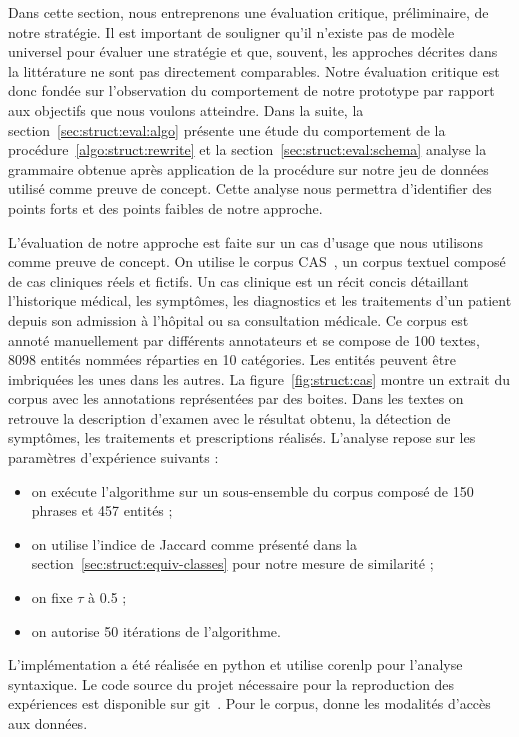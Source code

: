 Dans cette section, nous entreprenons une évaluation critique, préliminaire, de notre stratégie.
Il est important de souligner qu'il n'existe pas de modèle universel pour évaluer une stratégie et que, souvent, les approches décrites dans la littérature ne sont pas directement comparables.
Notre évaluation critique est donc fondée sur l'observation du comportement de notre prototype par rapport aux objectifs que nous voulons atteindre.
Dans la suite, la section~\ref{sec:struct:eval:algo} présente une étude du comportement de la procédure~\ref{algo:struct:rewrite} et la section~\ref{sec:struct:eval:schema} analyse la grammaire obtenue après application de la procédure sur notre jeu de données utilisé comme preuve de concept.
Cette analyse nous permettra d'identifier des points forts et des points faibles de notre approche.

L'évaluation de notre approche est faite sur un cas d'usage que nous utilisons comme preuve de concept.
On utilise le corpus CAS~\cite{grabarCASFrenchCorpus2018}, un corpus textuel composé de cas cliniques réels et fictifs.
Un cas clinique est un récit concis détaillant l'historique médical, les symptômes, les diagnostics et les traitements d'un patient depuis son admission à l'hôpital ou sa consultation médicale.
Ce corpus est annoté manuellement par différents annotateurs et se compose de \num{100} textes, \num{8098} entités nommées réparties en \num{10} catégories.
Les entités peuvent être imbriquées les unes dans les autres.
La figure~\ref{fig:struct:cas} montre un extrait du corpus avec les annotations représentées par des boites.
Dans les textes on retrouve la description d'examen avec le résultat obtenu, la détection de symptômes, les traitements et prescriptions réalisés.
L'analyse repose sur les paramètres d'expérience suivants :
\begin{itemize}
    \item on exécute l'algorithme sur un sous-ensemble du corpus composé de \num{150} phrases et \num{457} entités ;
    \item on utilise l'indice de Jaccard comme présenté dans la section~\ref{sec:struct:equiv-classes} pour notre mesure de similarité ;
    \item on fixe $\tau$ à \num{0.5} ;
    \item on autorise \num{50} itérations de l'algorithme.
\end{itemize}
L'implémentation a été réalisée en \gls{python} et utilise \gls{corenlp} pour l'analyse syntaxique.
Le code source du projet nécessaire pour la reproduction des expériences est disponible sur \gls{git}~\cite{chabinArchiTXT2024}.
Pour le corpus, \cite{grabarCASFrenchCorpus2018} donne les modalités d'accès aux données.

